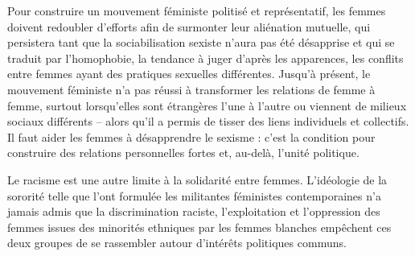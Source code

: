 

Pour construire un mouvement féministe politisé et représentatif, les femmes doivent redoubler d'efforts afin de surmonter leur aliénation mutuelle, qui persistera tant que la sociabilisation sexiste n'aura pas été désapprise et qui se traduit par l'homophobie, la tendance à juger d'après les apparences, les conflits entre femmes ayant des pratiques sexuelles différentes.
Jusqu'à présent, le mouvement féministe n'a pas réussi à transformer les relations de femme à femme, surtout lorsqu'elles sont étrangères l'une à l'autre ou viennent de milieux sociaux différents -- alors qu'il a permis de tisser des liens individuels et collectifs.
Il faut aider les femmes à désapprendre le sexisme : c'est la condition pour construire des relations personnelles fortes et, au-delà, l'unité politique.
\bigskip

Le racisme est une autre limite à la solidarité entre femmes. L'idéologie de la sororité telle que l'ont formulée les militantes féministes contemporaines n'a jamais admis que la discrimination raciste, l'exploitation et l'oppression des femmes issues des minorités ethniques par les femmes blanches empêchent ces deux groupes de se rassembler autour d'intérêts politiques communs.
\bigskip

